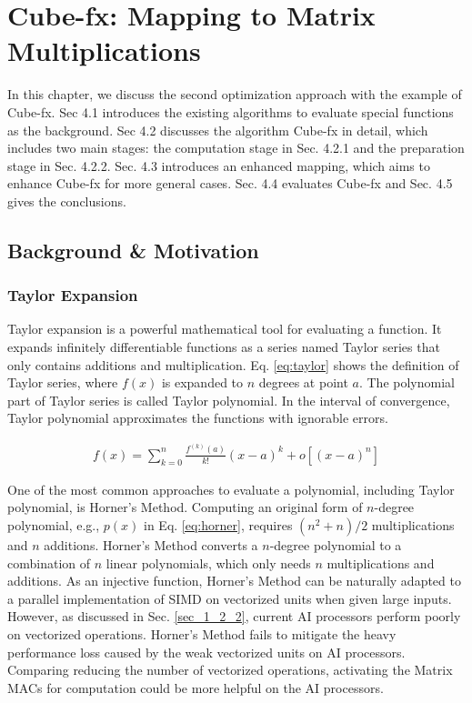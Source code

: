 \chapter{Cube-fx: Mapping to Matrix Multiplications}
\label{sec_4}

In this chapter, we discuss the second optimization approach with the example of Cube-fx. Sec 4.1 introduces the existing algorithms to evaluate special functions as the background. Sec 4.2 discusses the algorithm Cube-fx in detail, which includes two main stages: the computation stage in Sec. 4.2.1 and the preparation stage in Sec. 4.2.2. Sec. 4.3 introduces an enhanced mapping, which aims to enhance Cube-fx for more general cases. Sec. 4.4 evaluates Cube-fx and Sec. 4.5 gives the conclusions.

\section{Background \& Motivation}

\subsection{Taylor Expansion \label{sec:2.3}}

Taylor expansion is a powerful mathematical tool for evaluating a function. It expands infinitely differentiable functions as a series named Taylor series that only contains additions and multiplication. Eq. \ref{eq:taylor} shows the definition of Taylor series, where $f(x)$ is expanded to $n$ degrees at point $a$. The polynomial part of Taylor series is called Taylor polynomial. In the interval of convergence, Taylor polynomial approximates the functions with ignorable errors.

\begin{equation}
    \label{eq:taylor}
    \begin{aligned}
    f(x) = \sum_{k = 0}^{n}\frac{f^{(k)}(a)}{k!}(x - a)^k + o[(x - a) ^ n]
    \end{aligned}
    \end{equation}

One of the most common approaches to evaluate a polynomial, including Taylor polynomial, is Horner's Method. Computing an original form of $n$-degree polynomial, e.g., $p(x)$ in Eq. \ref{eq:horner}, requires $(n^2 + n)/2$ multiplications and $n$ additions. Horner's Method converts a $n$-degree polynomial to a combination of $n$ linear polynomials, which only needs $n$ multiplications and additions. As an injective function, Horner's Method can be naturally adapted to a parallel implementation of SIMD on vectorized units when given large inputs. However, as discussed in Sec. \ref{sec_1_2_2}, current AI processors perform poorly on vectorized operations. Horner's Method fails to mitigate the heavy performance loss caused by the weak vectorized units on AI processors. Comparing reducing the number of vectorized operations, activating the Matrix MACs for computation could be more helpful on the AI processors.

